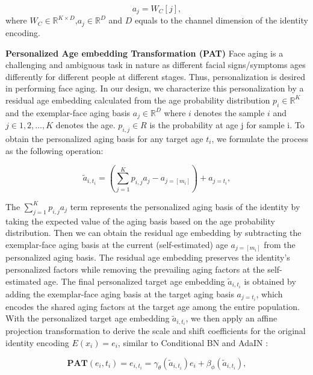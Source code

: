 \documentclass[final]{cvpr}
\begin{document}
\begin{equation}
a_j= W_C[j],
\label{age_basis}
\end{equation}
where \(W_C \in \mathbb{R}^{K \times D}\),\(a_j \in \mathbb{R}^D\) and \(D\) equals to the channel dimension of the identity encoding.




\textbf{Personalized Age embedding Transformation (PAT)}
Face aging is a challenging and ambiguous task in nature as different facial signs/symptoms ages differently for different people at different stages. Thus, personalization is desired in performing face aging. In our design, we characterize this personalization by a residual age embedding calculated from the age probability distribution \(p_{i} \in \mathbb{R}^K\) and the exemplar-face aging basis \(a_{j} \in \mathbb{R}^D\) where \(i\) denotes the sample \(i\) and \(j \in {1,2,…,K}\) denotes the age. \(p_{i,j} \in R\) is the probability at age j for sample i. To obtain the personalized aging basis for any target age \(t_i\), we formulate the process as the following operation:

\begin{equation}
\tilde{a}_{i,t_i} = (\sum_{j=1}^{K} p_{i,j}a_{j} - a_{j=[m_i]}) + a_{j=t_i},
\label{personalized_age_basis}
\end{equation}

The \(\sum_{j=1}^{K} p_{i,j}a_{j}\) term represents the personalized aging basis of the identity by taking the expected value of the aging basis based on the age probability distribution. Then we can obtain the residual age embedding by subtracting the exemplar-face aging basis at the current (self-estimated) age \(a_{j=[m_i]}\) from the personalized aging basis. The residual age embedding preserves the identity’s personalized factors while removing the prevailing aging factors at the self-estimated age. The final personalized target age embedding \(\tilde{a}_{i,t_i}\) is obtained by adding the exemplar-face aging basis at the target aging basis \(a_{j=t_i}\), which encodes the shared aging factors at the target age among the entire population. 
With the personalized target age embedding \(\tilde{a}_{i,t_i}\), we then apply an affine projection transformation to derive the scale and shift coefficients for the original identity encoding \(E(x_i)=e_i\), similar to Conditional BN \cite{NIPS2017_7237} and AdaIN \cite{huang2017adain}:

\begin{equation}
\mathbf{PAT}(e_i, t_i) = e_{i, t_i} = \gamma_\theta(\tilde{a}_{i,t_i}) e_i + \beta_\phi(\tilde{a}_{i,t_i}),
\label{personalized_age_transformation}
\end{equation}
\end{document}
